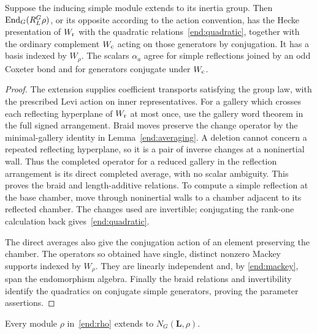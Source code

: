 \begin{lemma}
\label{end:presentation}
Suppose the inducing simple module extends to its inertia group.
Then $\operatorname{End}_G(R_L^G\rho)$, or its opposite according to the action
convention, has the Hecke presentation of $W_{\rm r}$ with the
quadratic relations~\eqref{end:quadratic}, together with the
ordinary complement $W_{\rm c}$ acting on those generators by
conjugation.  It has a basis indexed by $W_\rho$.  The scalars
$\alpha_a$ agree for simple reflections joined by an odd Coxeter
bond and for generators conjugate under $W_{\rm c}$.
\end{lemma}

\begin{proof}
The extension supplies coefficient transports satisfying the group
law, with the prescribed Levi action on inner representatives.
For a gallery which crosses each reflecting hyperplane of
$W_{\rm r}$ at most once, use the gallery word theorem in the full
signed arrangement.  Braid moves preserve the change operator by
the minimal-gallery identity in Lemma~\ref{end:averaging}.  A
deletion cannot concern a repeated reflecting hyperplane, so it
is a pair of inverse changes at a noninertial wall.  Thus the
completed operator for a reduced gallery in the reflection
arrangement is its direct completed average, with no scalar
ambiguity.  This proves the braid and length-additive relations.
To compute a simple reflection at the base chamber, move through
noninertial walls to a chamber adjacent to its reflected chamber.
The changes used are invertible; conjugating the rank-one
calculation back gives~\eqref{end:quadratic}.

The direct averages also give the conjugation action of an
element preserving the chamber.  The operators so
obtained have single, distinct nonzero Mackey supports indexed by
$W_\rho$.  They are linearly independent and, by
\eqref{end:mackey}, span the endomorphism algebra.  Finally the
braid relations and invertibility identify the quadratics on
conjugate simple generators, proving the parameter assertions.
\end{proof}

\begin{lemma}\label{end:extension}
Every module $\rho$ in~\eqref{end:rho} extends to $N_G(\mathbf L,\rho)$.
\end{lemma}

